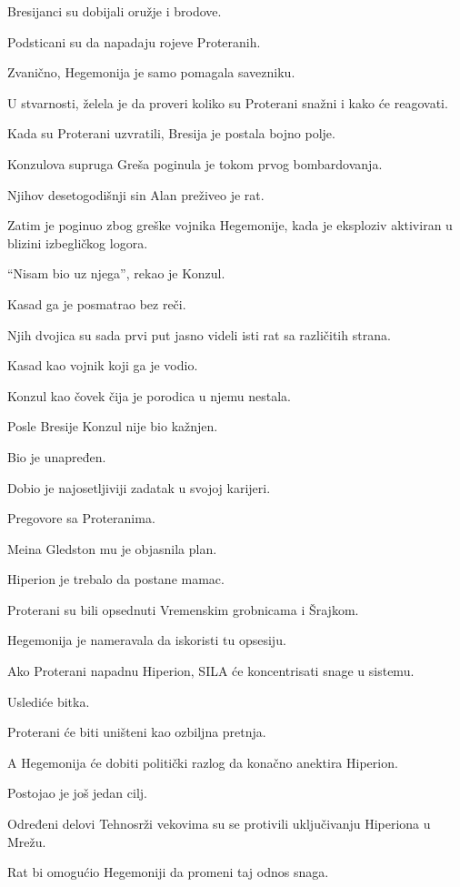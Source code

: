 Bresijanci su dobijali oružje i brodove.

Podsticani su da napadaju rojeve Proteranih.

Zvanično, Hegemonija je samo pomagala savezniku.

U stvarnosti, želela je da proveri koliko su Proterani snažni i kako će reagovati.

Kada su Proterani uzvratili, Bresija je postala bojno polje.

Konzulova supruga Greša poginula je tokom prvog bombardovanja.

Njihov desetogodišnji sin Alan preživeo je rat.

Zatim je poginuo zbog greške vojnika Hegemonije, kada je eksploziv aktiviran u blizini izbegličkog logora.

``Nisam bio uz njega'', rekao je Konzul.

Kasad ga je posmatrao bez reči.

Njih dvojica su sada prvi put jasno videli isti rat sa različitih strana.

Kasad kao vojnik koji ga je vodio.

Konzul kao čovek čija je porodica u njemu nestala.

\bigskip

Posle Bresije Konzul nije bio kažnjen.

Bio je unapređen.

Dobio je najosetljiviji zadatak u svojoj karijeri.

Pregovore sa Proteranima.

Meina Gledston mu je objasnila plan.

Hiperion je trebalo da postane mamac.

Proterani su bili opsednuti Vremenskim grobnicama i Šrajkom.

Hegemonija je nameravala da iskoristi tu opsesiju.

Ako Proterani napadnu Hiperion, SILA će koncentrisati snage u sistemu.

Uslediće bitka.

Proterani će biti uništeni kao ozbiljna pretnja.

A Hegemonija će dobiti politički razlog da konačno anektira Hiperion.

Postojao je još jedan cilj.

Određeni delovi Tehnosrži vekovima su se protivili uključivanju Hiperiona u Mrežu.

Rat bi omogućio Hegemoniji da promeni taj odnos snaga.


